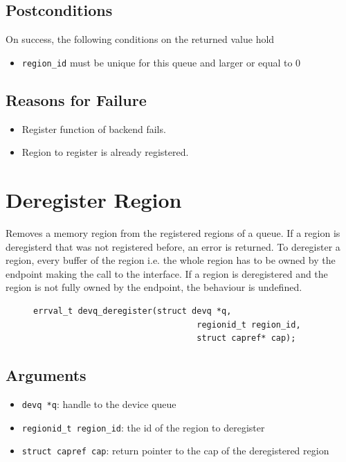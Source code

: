 \documentclass[a4paper,11pt,twoside]{report}
\begin{document}
	\subsection*{Postconditions}
	On success, the following conditions on the returned value hold
	\begin{itemize}
		\item \texttt{region\_id} must be unique for this queue and larger or equal to 0
	\end{itemize}
	
	\subsection*{Reasons for Failure}
	\begin{itemize}
		\item Register function of backend fails.
		\item Region to register is already registered.
	\end{itemize}
	
	\section{Deregister Region}
	Removes a memory region from the registered regions of a queue. 
	If a region is deregisterd that was not registered before, an error is returned. 
	To deregister a region, every buffer of the region i.e. the whole region has to be 
	owned by the endpoint making the call to the interface. If a region is deregistered and the 
	region is not fully owned by the endpoint, the behaviour is undefined.  
	\begin{figure}[h]
		\begin{lstlisting}[style=code]
        errval_t devq_deregister(struct devq *q,
                                 regionid_t region_id,
                                 struct capref* cap);
		\end{lstlisting}
		\label{lst:deregister}
	\end{figure}
	
	\subsection*{Arguments}
	\begin{itemize}
		\item \texttt{devq *q}: handle to the device queue
		\item \texttt{regionid\_t region\_id}: the id of the region to deregister
		\item \texttt{struct capref cap}: return pointer to the cap of the deregistered region
	\end{itemize}
	
\end{document}
